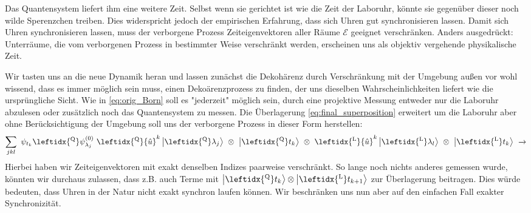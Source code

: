 \documentclass[12pt]{article}
\begin{document}
Das Quantensystem liefert ihm eine weitere Zeit. Selbst wenn sie gerichtet ist wie die Zeit der Laboruhr, könnte sie gegenüber dieser noch wilde Sperenzchen treiben. Dies widerspricht jedoch der empirischen Erfahrung, dass sich Uhren gut synchronisieren lassen. Damit sich Uhren synchronisieren lassen, muss der verborgene Prozess Zeiteigenvektoren aller Räume $\mathscr{E}$ geeignet verschränken. Anders ausgedrückt: Unterräume, die vom verborgenen Prozess in bestimmter Weise verschränkt werden, erscheinen uns als objektiv vergehende physikalische Zeit.

Wir tasten uns an die neue Dynamik heran und lassen zunächst die Dekohärenz durch Verschränkung mit der Umgebung außen vor wohl wissend, dass es immer möglich sein muss, einen Dekoärenzprozess zu finden, der uns dieselben Wahrscheinlichkeiten liefert wie die ursprüngliche Sicht. Wie in \eqref{eq:orig_Born} soll es "jederzeit" möglich sein, durch eine projektive Messung entweder nur die Laboruhr abzulesen oder zusätzlich noch das Quantensystem zu messen. Die Überlagerung \eqref{eq:final_superposition} erweitert um die Laboruhr aber ohne Berücksichtigung der Umgebung soll uns der verborgene Prozess in dieser Form herstellen:
\begin{equation}
\label{eq:superposition_with_lab}
\sum_{jkl}\ \psi_{t_k} \leftidx{^\mathrm{Q}}\psi_{\lambda_j}^{(0)}\ 
\leftidx{^\mathrm{Q}}{\hat{u}}^k 
\ket{\leftidx{^\mathrm{Q}}\lambda_j} 
\ \otimes\ \ket{\leftidx{^\mathrm{Q}}t_k}
\ \otimes\ \leftidx{^\mathrm{L}}{\hat{u}}^k \ket{ \leftidx{^\mathrm{L}}\lambda_l} 
\ \otimes\ \ket{\leftidx{^\mathrm{L}}t_k}
\ \xrightarrow{}
\end{equation}
Hierbei haben wir Zeiteigenvektoren mit exakt denselben Indizes paarweise verschränkt. So lange noch nichts anderes gemessen wurde, könnten wir durchaus zulassen, dass z.B. auch Terme mit $\ket{\leftidx{^\mathrm{Q}}t_k} \otimes \ket{\leftidx{^\mathrm{L}}t_{k+1}}$ zur Überlagerung beitragen. Dies würde bedeuten, dass Uhren in der Natur nicht exakt synchron laufen können. Wir beschränken uns nun aber auf den einfachen Fall exakter Synchronizität.
\end{document}
